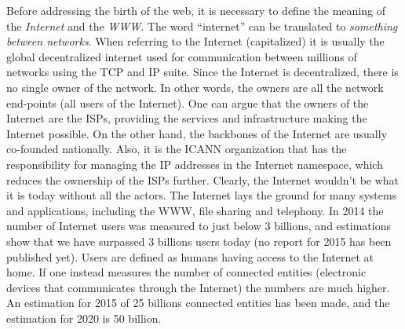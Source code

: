 \documentclass[a4paper,11pt]{kth-mag}
\begin{document}
      Before addressing the birth of the \gls{web}, it is necessary to define the meaning of the \emph{Internet} and the \emph{\gls{WWW}}.
      The word ``internet'' can be translated to \emph{something between networks}.
      When referring to the Internet (capitalized) it is usually the global decentralized internet used for communication between millions of networks using the \gls{TCP} and \gls{IP} suite.
      Since the Internet is decentralized, there is no single owner of the network.
      In other words, the owners are all the network end-points (all users of the Internet).
      One can argue that the owners of the Internet are the \glspl{ISP}, providing the services and infrastructure making the Internet possible.
      On the other hand, the backbones of the Internet are usually co-founded nationally.
      Also, it is the \gls{ICANN} organization that has the responsibility for managing the \gls{IP} addresses in the Internet namespace, which reduces the ownership of the \glspl{ISP} further.
      Clearly, the Internet wouldn't be what it is today without all the actors.
      The Internet lays the ground for many systems and applications, including the \gls{WWW}, file sharing and telephony.
      In 2014 the number of Internet users was measured to just below 3 billions, and estimations show that we have surpassed 3 billions users today (no report for 2015 has been published yet).
      Users are defined as humans having access to the Internet at home.
      If one instead measures the number of connected entities (electronic devices that communicates through the Internet) the numbers are much higher.
      An estimation for 2015 of 25 billions connected entities has been made, and the estimation for 2020 is 50 billion.
      
\end{document}

